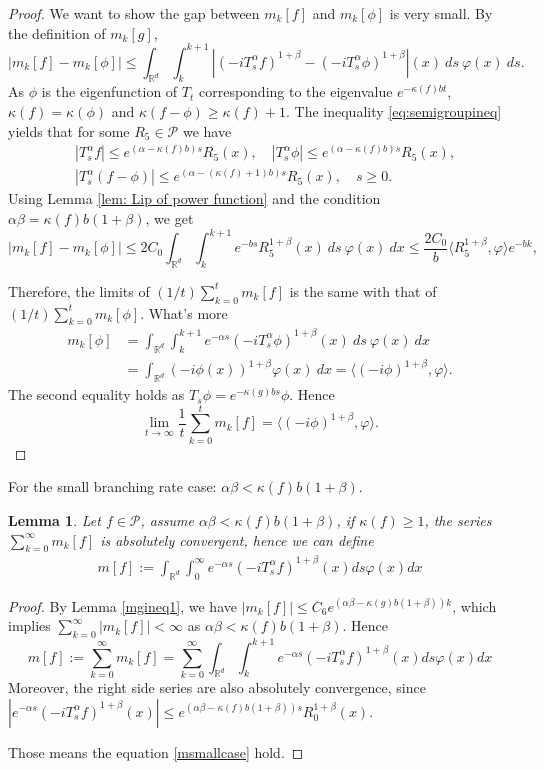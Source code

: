 \documentclass[12pt,oneside,english]{amsart}
\theoremstyle{plain}
\newtheorem{lem}[thm]{Lemma}
\theoremstyle{definition}
\numberwithin{equation}{section}
\begin{document}
\begin{proof}
    We want to show the gap between $m_k[f]$ and $m_k[\phi]$ is very small. By the definition of $m_k[g]$,
    $$|m_k[f]-m_k[\phi]|\leq\int_{\mathbb{R}^d}\int_k^{k+1}\left|(-i T^{\alpha}_s f)^{1+\beta}-(-i T^{\alpha}_s \phi)^{1+\beta}\right|(x)~ds~\varphi(x)~ds.$$
    As $\phi$ is the eigenfunction of $T_t$ corresponding to the eigenvalue $e^{-\kappa(f)bt}$,  $\kappa(f)=\kappa(\phi)$ and $\kappa(f-\phi)\geq \kappa(f)+1$. The inequality \eqref{eq:semigroupineq} yields that for some $R_5\in\mathcal{P}$ we have
    \begin{align*}
        &|T_s^{\alpha}f|\leq e^{(\alpha-\kappa(f)b)s}R_5(x), \quad|T_s^{\alpha}\phi|\leq e^{(\alpha-\kappa(f)b)s}R_5(x), \\
        &|T_s^{\alpha}(f-\phi)|\leq e^{(\alpha-(\kappa(f)+1)b)s}R_5(x), \quad s\geq0.
    \end{align*}
  Using Lemma \ref{lem: Lip of power function} and the condition $\alpha\beta=\kappa(f)b(1+\beta)$, we get
    $$|m_k[f]-m_k[\phi]|\leq2C_0\int_{\mathbb{R}^d}\int_k^{k+1}e^{-bs}R_5^{1+\beta}(x)~ds~\varphi(x)~dx\leq \frac{2C_0}{b}\langle R_5^{1+\beta},\varphi\rangle e^{-bk},$$

    Therefore, the limits of $(1/t)\sum_{k=0}^tm_k[f]$ is the same with that of $(1/t)\sum_{k=0}^tm_k[\phi]$. What's more
    \begin{align*}
        m_k[\phi]&=\int_{\mathbb{R}^d}\int_k^{k+1} e^{-\alpha s}(-iT_{s}^{\alpha}\phi)^{1+\beta}(x)~ds~\varphi(x)~dx\\
        &=\int_{\mathbb{R}^d}(-i\phi(x))^{1+\beta}\varphi (x)~dx=\langle (-i\phi)^{1+\beta},\varphi\rangle.
    \end{align*}
    The second equality holds as $T_s\phi=e^{-\kappa(g)bs}\phi$. Hence
    $$\lim_{t\rightarrow \infty}\frac{1}{t}\sum_{k=0}^{t}m_k[f]=\langle(-i\phi)^{1+\beta},\varphi\rangle.$$
\end{proof}

For the small branching rate case: $\alpha\beta<\kappa(f)b(1+\beta)$.
\begin{lem}\label{lemma211}
Let $f\in \mathcal{P}$, assume $\alpha\beta<\kappa(f)b(1+\beta)$, if $\kappa(f)\geq 1$, the series $\sum_{k=0}^{\infty}m_k[f]$ is absolutely convergent, hence we can define
\begin{align}
    m[f]:=\int_{\mathbb{R}^d}\int_0^{\infty} e^{-\alpha s}(-iT_{s}^{\alpha}f)^{1+\beta}(x)ds\varphi(x)dx \label{msmallcase}
\end{align}
\end{lem}
\begin{proof}
    By Lemma \ref{mgineq1}, we have $|m_k[f]|\leq C_6 e^{(\alpha\beta-\kappa(g)b(1+\beta))k}$, which implies $\sum_{k=0}^{\infty}|m_k[f]|<\infty$ as $\alpha\beta<\kappa(f)b(1+\beta)$. Hence
    $$m[f]:=\sum_{k=0}^{\infty}m_k[f]=\sum_{k=0}^{\infty}\int_{\mathbb{R}^d}\int_k^{k+1} e^{-\alpha s}(-iT_{s}^{\alpha}f)^{1+\beta}(x)ds\varphi(x)dx$$
     Moreover, the right side series are also absolutely convergence, since $|e^{-\alpha s}(-iT_{s}^{\alpha}f)^{1+\beta}(x)|\leq e^{(\alpha\beta-\kappa(f)b(1+\beta))s}R_0^{1+\beta}(x)$.

     Those means the equation \eqref{msmallcase} hold.
\end{proof}
\end{document}
